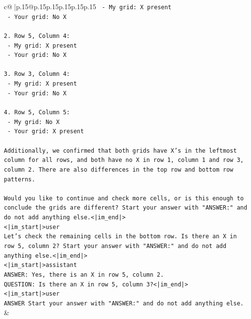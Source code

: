 \documentclass{article}
\begin{document}
{\begin{supertabular}{c@{$\;$}|p{.15\linewidth}@{}p{.15\linewidth}p{.15\linewidth}p{.15\linewidth}p{.15\linewidth}p{.15\linewidth}}
{{{\texttt{   {-} My grid: X present} \\
\texttt{   {-} Your grid: No X} \\
\\ 
\texttt{2. Row 5, Column 4:} \\
\texttt{   {-} My grid: X present} \\
\texttt{   {-} Your grid: No X} \\
\\ 
\texttt{3. Row 3, Column 4:} \\
\texttt{   {-} My grid: X present} \\
\texttt{   {-} Your grid: No X} \\
\\ 
\texttt{4. Row 5, Column 5:} \\
\texttt{   {-} My grid: No X} \\
\texttt{   {-} Your grid: X present} \\
\\ 
\texttt{Additionally, we confirmed that both grids have X's in the leftmost column for all rows, and both have no X in row 1, column 1 and row 3, column 2. There are also differences in the top row and bottom row patterns.} \\
\\ 
\texttt{Would you like to continue and check more cells, or is this enough to conclude the grids are different? Start your answer with "ANSWER:" and do not add anything else.<|im\_end|>} \\
\texttt{<|im\_start|>user} \\
\texttt{Let's check the remaining cells in the bottom row. Is there an X in row 5, column 2? Start your answer with "ANSWER:" and do not add anything else.<|im\_end|>} \\
\texttt{<|im\_start|>assistant} \\
\texttt{ANSWER: Yes, there is an X in row 5, column 2.} \\
\texttt{QUESTION: Is there an X in row 5, column 3?<|im\_end|>} \\
\texttt{<|im\_start|>user} \\
\texttt{ANSWER Start your answer with "ANSWER:" and do not add anything else.} \\
            }
        }
    }
    & \\ \\


\end{supertabular}}
\end{document}

